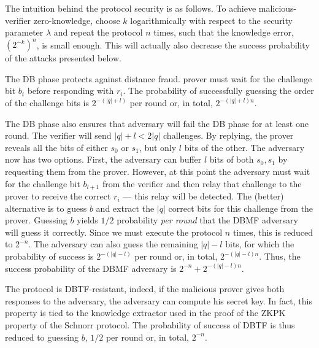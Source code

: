 The intuition behind the protocol security is as follows.
To achieve malicious-verifier zero-knowledge, choose \(k\) logarithmically with 
respect to the security parameter \(\lambda\) and repeat the protocol \(n\) 
times, such that the knowledge error, \((2^{-k})^n\), is small enough.
This will actually also decrease the success probability of the attacks 
presented below.

The \ac{DB} phase protects against distance fraud.
 prover must wait for the challenge bit \(b_i\) before responding 
with \(r_i\).
The probability of successfully guessing the order of the challenge bits is 
\(2^{-(|q|+l)}\) per round or, in total, \(2^{-(|q|+l)n}\).

The \ac{DB} phase also ensures that  adversary will fail the \ac{DB} 
phase for at least one round.
The verifier will send \(|q| + l < 2|q|\) challenges.
By replying, the prover reveals all the bits of either \(s_0\) or \(s_1\), but 
only \(l\) bits of the other.
The adversary now has two options.
First, the adversary can buffer \(l\) bits of both \(s_0, s_1\) by requesting 
them from the prover.
However, at this point the adversary must wait for the challenge bit 
\(b_{l+1}\) from the verifier and then relay that challenge to the prover to 
receive the correct \(r_i\) --- this relay will be detected.
The (better) alternative is to guess \(b\) and extract the \(|q|\) correct bits 
for this challenge from the prover.
Guessing \(b\) yields \(1/2\) probability \emph{per round} that the \ac{DBMF} 
adversary will guess it correctly.
Since we must execute the protocol \(n\) times, this is reduced to \(2^{-n}\).
The adversary can also guess the remaining \(|q|-l\) bits, for which the 
probability of success is \(2^{-(|q|-l)}\) per round or, in total, 
\(2^{-(|q|-l)n}\).
Thus, the success probability of the \ac{DBMF} adversary is 
\(2^{-n}+2^{-(|q|-l)n}\).


The protocol is \ac{DBTF}-resistant, indeed, if the malicious prover gives both 
responses to the adversary, the adversary can compute his secret key.
In fact, this property is tied to the knowledge extractor used in the proof of 
the \ac{ZKPK} property of the Schnorr protocol.
The probability of success of \ac{DBTF} is thus reduced to guessing \(b\), \ie 
\(1/2\) per round or, in total, \(2^{-n}\).

